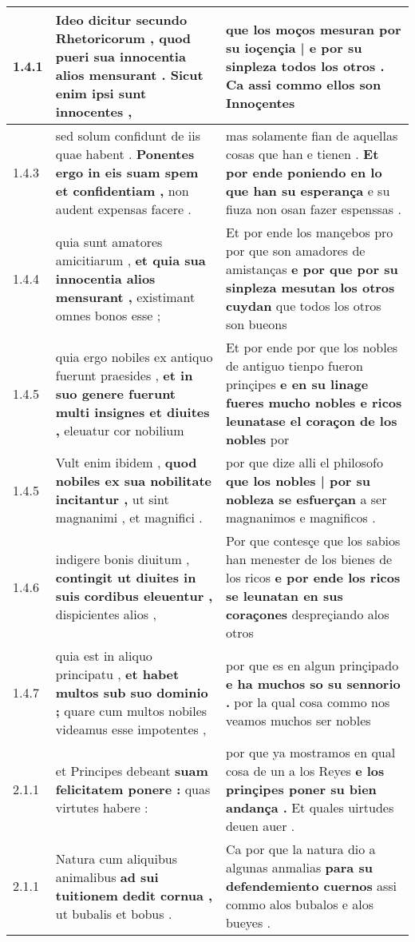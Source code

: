 \begin{tabular}{|p{1cm}|p{6.5cm}|p{6.5cm}|}
1.4.1 & Ideo dicitur secundo Rhetoricorum , \textbf{ quod pueri sua innocentia alios mensurant . } Sicut enim ipsi sunt innocentes , & que los moços mesuran \textbf{ por su ioçençia | e por su sinpleza todos los otros . } Ca assi commo ellos son Innoçentes \\\hline
1.4.3 & sed solum confidunt de iis quae habent . \textbf{ Ponentes ergo in eis suam spem et confidentiam , } non audent expensas facere . & mas solamente fian de aquellas cosas que han e tienen . \textbf{ Et por ende poniendo en lo que han su esperança } e su fiuza non osan fazer espenssas . \\\hline
1.4.4 & quia sunt amatores amicitiarum , \textbf{ et quia sua innocentia alios mensurant , } existimant omnes bonos esse ; & Et por ende los mançebos pro por que son amadores de amistanças \textbf{ e por que por su sinpleza mesutan los otros cuydan } que todos los otros son bueons \\\hline
1.4.5 & quia ergo nobiles ex antiquo fuerunt praesides , \textbf{ et in suo genere fuerunt multi insignes et diuites , } eleuatur cor nobilium & Et por ende por que los nobles de antiguo tienpo fueron prinçipes \textbf{ e en su linage fueres mucho nobles e ricos leunatase el coraçon de los nobles } por \\\hline
1.4.5 & Vult enim ibidem , \textbf{ quod nobiles ex sua nobilitate incitantur , } ut sint magnanimi , et magnifici . & por que dize alli el philosofo \textbf{ que los nobles | por su nobleza se esfuerçan } a ser magnanimos e magnificos . \\\hline
1.4.6 & indigere bonis diuitum , \textbf{ contingit ut diuites in suis cordibus eleuentur , } dispicientes alios , & Por que contesçe que los sabios han menester de los bienes de los ricos \textbf{ e por ende los ricos se leunatan en sus coraçones } despreçiando alos otros \\\hline
1.4.7 & quia est in aliquo principatu , \textbf{ et habet multos sub suo dominio ; } quare cum multos nobiles videamus esse impotentes , & por que es en algun prinçipado \textbf{ e ha muchos so su sennorio . } por la qual cosa commo nos veamos muchos ser nobles \\\hline
2.1.1 & et Principes debeant \textbf{ suam felicitatem ponere : } quas virtutes habere : & por que ya mostramos en qual cosa de un a los Reyes \textbf{ e los prinçipes poner su bien andança . } Et quales uirtudes deuen auer . \\\hline
2.1.1 & Natura cum aliquibus animalibus \textbf{ ad sui tuitionem dedit cornua , } ut bubalis et bobus . & Ca por que la natura dio a algunas anmalias \textbf{ para su defendemiento cuernos } assi commo alos bubalos e alos bueyes . \\\hline

\end{tabular}
